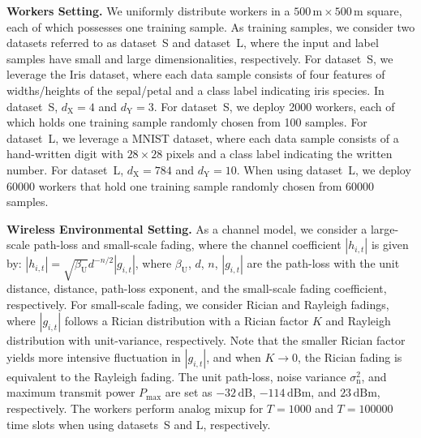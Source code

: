 \documentclass[conference,10pt]{IEEEtran}
\theoremstyle{definition}
\theoremstyle{definition}
\begin{document}
\vspace{.3em}\noindent\textbf{Workers Setting.}\quad
We uniformly distribute workers in a $500\,\mathrm{m}\times 500\,\mathrm{m}$ square, each of which possesses one training sample.
As training samples, we consider two datasets referred to as dataset~S and dataset~L, where the input and label samples have small and large dimensionalities, respectively.
For dataset~S, we leverage the Iris dataset\cite{iris}, where each data sample consists of four features of widths/heights of the sepal/petal and a class label indicating iris species.
In dataset~S, $d_{\mathrm{X}} = 4$ and $d_{\mathrm{Y}} = 3$.
For dataset~S, we deploy 2000 workers, each of which holds one training sample randomly chosen from 100 samples.
For dataset~L, we leverage a MNIST dataset\cite{MNIST}, where each data sample consists of a hand-written digit with $28\times 28$ pixels and a class label indicating the written number.
For dataset~L, $d_{\mathrm{X}} = 784$ and $d_{\mathrm{Y}} = 10$.
When using dataset~L, we deploy 60000 workers that hold one training sample randomly chosen from 60000 samples.

\vspace{.3em}\noindent\textbf{Wireless Environmental Setting.}\quad
As a channel model, we consider a large-scale path-loss and small-scale fading, where the channel coefficient $|h_{i, t}|$ is given by: $|h_{i, t}| = \sqrt{\beta_{\mathrm{U}}}d^{-n/2}|g_{i, t}|$, where $\beta_{\mathrm{U}}$, $d$, $n$, $|g_{i, t}|$ are the path-loss with the unit distance, distance, path-loss exponent, and the small-scale fading coefficient, respectively.
For small-scale fading, we consider Rician and Rayleigh fadings, where $|g_{i, t}|$ follows a Rician distribution with a Rician factor $K$ and Rayleigh distribution with unit-variance, respectively.
Note that the smaller Rician factor yields more intensive fluctuation in $|g_{i, t}|$, and when $K \to 0$, the Rician fading is equivalent to the Rayleigh fading.
The unit path-loss, noise variance $\sigma_{\mathrm{n}}^2$, and maximum transmit power $P_{\mathrm{max}}$ are set as $-32\,\mathrm{dB}$, $-114\,\mathrm{dBm}$, and $23\,\mathrm{dBm}$, respectively.
The workers perform analog mixup for $T = 1000$ and $T = 100000$ time slots when using datasets~S and L, respectively.
\end{document}
